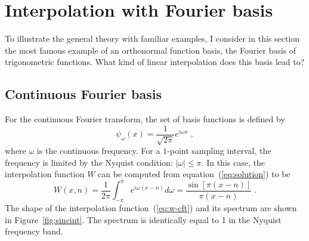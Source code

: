 \section{Interpolation with Fourier basis}
To illustrate the general theory with familiar examples, I consider
in this section the most famous example of an orthonormal function
basis, the Fourier basis of trigonometric functions. What kind of
linear interpolation does this basis lead to?

\subsection{Continuous Fourier basis}


For the continuous Fourier transform, the set of basis functions is
defined by
\begin{equation}\label{eq:cft}
  \psi_\omega (x) = \frac{1}{\sqrt{2 \pi}} e^{i \omega x} \;,
\end{equation}
where $\omega$ is the continuous frequency. For a $1$-point
sampling interval, the frequency is limited by the Nyquist
condition: $|\omega| \leq \pi$. In this case, the interpolation
function $W$ can be computed from equation~(\ref{eq:solution}) to be
\begin{equation}\label{eq:w-cft}
  W (x, n) = \frac{1}{2 \pi} \int_{-\pi}^{\pi} e^{i \omega (x-n)}
  d\omega = \frac{\sin \left[\pi (x - n) \right]}{\pi (x - n)} \;.
\end{equation}
The shape of the interpolation function~(\ref{eq:w-cft}) and its
spectrum are shown in Figure~\ref{fig:sincint}. The spectrum is
identically equal to 1 in the Nyquist frequency band.


